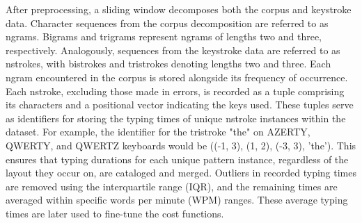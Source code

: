 \noindent After preprocessing, a sliding window decomposes both the corpus and keystroke data. Character sequences from the corpus decomposition are referred to as ngrams. Bigrams and trigrams represent ngrams of lengths two and three, respectively. Analogously, sequences from the keystroke data are referred to as nstrokes, with bistrokes and tristrokes denoting lengths two and three. Each ngram encountered in the corpus is stored alongside its frequency of occurrence. Each nstroke, excluding those made in errors, is recorded as a tuple comprising its characters and a positional vector indicating the keys used. These tuples serve as identifiers for storing the typing times of unique nstroke instances within the dataset. For example, the identifier for the tristroke "the" on AZERTY, QWERTY, and QWERTZ keyboards would be ((-1, 3), (1, 2), (-3, 3), 'the'). This ensures that typing durations for each unique pattern instance, regardless of the layout they occur on, are cataloged and merged. Outliers in recorded typing times are removed using the interquartile range (IQR), and the remaining times are averaged within specific words per minute (WPM) ranges. These average typing times are later used to fine-tune the cost functions.





